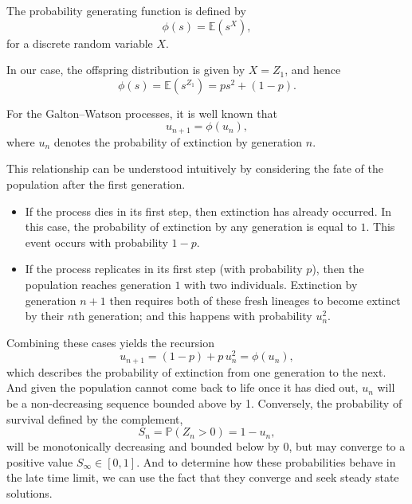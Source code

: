 \documentclass[11pt]{article}
\begin{document}
\vspace{12pt}


\noindent
The probability generating function is defined by
\[
\phi(s) = \mathbb{E}(s^{X}),
\]
for a discrete random variable $X$.

In our case, the offspring distribution is given by $X = Z_1$, and hence
\[
\phi(s) = \mathbb{E}(s^{Z_1}) = p s^2 + (1-p).
\]


\noindent
For the Galton--Watson processes, it is well known that
\[
u_{n+1} = \phi(u_n),
\]
where $u_n$ denotes the probability of extinction by generation $n$.

This relationship can be understood intuitively by considering the fate of the
population after the first generation.

\begin{itemize}
    \item If the process dies in its first step, then extinction has already
    occurred. In this case, the probability of extinction by any generation is
    equal to $1$. This event occurs with probability $1-p$.
    \item If the process replicates in its first step (with probability $p$), then the population
    reaches generation $1$ with two individuals. Extinction by generation $n+1$
    then requires both of these fresh lineages to become extinct by their $n$th generation; and this happens with probability $u_n^2$.
\end{itemize}

\noindent
Combining these cases yields the recursion
\begin{equation}
u_{n+1} = (1-p) + p\, u_n^2 = \phi(u_n),
\label{eq:unrec}
\end{equation}
which describes the probability of extinction from one generation to the next. And given the population cannot come
back to life once it has died out, $u_n$ will be a non-decreasing sequence bounded above by 1. Conversely, the probability of survival
defined by the complement, $$ S_n = \mathbb{P}(Z_n > 0)  = 1-u_n,$$ will be monotonically decreasing and bounded below by 0, but may converge to a positive value $S_\infty \in [0,1]$.
And to determine how these probabilities behave in the late time limit, we can use the fact that they converge and seek steady state solutions.
\end{document}
